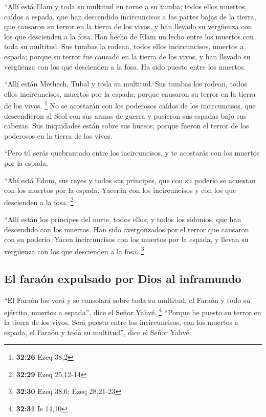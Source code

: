  ``Allí está Elam y toda su multitud en torno a su tumba;
todos ellos muertos, caídos a espada, que han descendido incircuncisos a
las partes bajas de la tierra, que causaron su terror en la tierra de
los vivos, y han llevado su vergüenza con los que descienden a la fosa.
 Han hecho de Elam un lecho entre los muertos con toda su
multitud. Sus tumbas la rodean, todos ellos incircuncisos, muertos a
espada; porque su terror fue causado en la tierra de los vivos, y han
llevado su vergüenza con los que descienden a la fosa. Ha sido puesto
entre los muertos.

 ``Allí están Meshech, Tubal y toda su multitud. Sus
tumbas los rodean, todos ellos incircuncisos, muertos por la espada;
porque causaron su terror en la tierra de los vivos. \footnote{\textbf{32:26}
  Ezeq 38,2}  No se acostarán con los poderosos caídos de
los incircuncisos, que descendieron al Seol con sus armas de guerra y
pusieron sus espadas bajo sus cabezas. Sus iniquidades están sobre sus
huesos; porque fueron el terror de los poderosos en la tierra de los
vivos.

 ``Pero tú serás quebrantado entre los incircuncisos, y
te acostarás con los muertos por la espada.

 ``Ahí está Edom, sus reyes y todos sus príncipes, que
con su poderío se acuestan con los muertos por la espada. Yacerán con
los incircuncisos y con los que descienden a la fosa. \footnote{\textbf{32:29}
  Ezeq 25,12-14}

 ``Allí están los príncipes del norte, todos ellos, y
todos los sidonios, que han descendido con los muertos. Han sido
avergonzados por el terror que causaron con su poderío. Yacen
incircuncisos con los muertos por la espada, y llevan su vergüenza con
los que descienden a la fosa. \footnote{\textbf{32:30} Ezeq 38,6; Ezeq
  28,21-23}

\hypertarget{el-farauxf3n-expulsado-por-dios-al-inframundo}{%
\subsection{El faraón expulsado por Dios al
inframundo}\label{el-farauxf3n-expulsado-por-dios-al-inframundo}}

 ``El Faraón los verá y se consolará sobre toda su
multitud, el Faraón y todo su ejército, muertos a espada'', dice el
Señor Yahvé. \footnote{\textbf{32:31} Is 14,10}  ``Porque
he puesto su terror en la tierra de los vivos. Será puesto entre los
incircuncisos, con los muertos a espada, el Faraón y toda su multitud'',
dice el Señor Yahvé.

